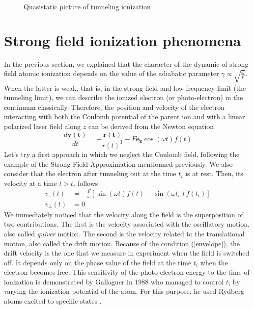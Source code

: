 \documentclass[a4paper]{article}
\begin{document}
\begin{figure}[h] 
\centering
 
 \caption{Quasistatic picture of tunneling ionization}
 \label{tunneling_ionization} 
\end{figure}

\section{Strong field ionization phenomena}

In the previous section, we explained that the character of the dynamic of strong field atomic ionization depends on the value of the adiabatic parameter $\gamma \propto \sqrt{\frac{\omega}{F}}$. When the latter is weak, that is, in the strong field and low-frequency limit (the tunneling limit), we can describe the ionized electron (or photo-electron) in the continuum classically. Therefore, the position and velocity of the electron interacting with both the Coulomb potential of the parent ion and with a linear polarized laser field along $z$ can be derived from the Newton equation
\begin{equation}
\frac{d \mathbf{v(t)}}{dt}=-\frac{\mathbf{r(t)}}{r(t)^{3}}-F\mathbf{e_{z}}\cos(\omega t) f(t) 
\end{equation}
Let's try a first approach in which we neglect the Coulomb field, following the example of the Strong Field Approximation mentionned previously. We also consider that the electron after tunneling out at the time $t_{i}$ is at rest. Then, its velocity at a time $t>t_{i}$ follows
\begin{align}
\label{velocity_free_motion}
v_{z}(t)&=-\frac{F}{\omega}\left[\sin(\omega t) f(t)-\sin(\omega t_{i}) f(t_{i})\right] \\
v_{\perp}(t)&=0
\end{align}
We immediately noticed that the velocity along the field is the superposition of two contributions. The first is the velocity associated with the oscillatory motion, also called \textit{quiver} motion. The second is the velocity related to the translational motion, also called the drift motion. Because of the condition (\ref{envelope}), the drift velocity is the one that we measure in experiment when the field is switched off. It depends only on the phase value of the field at the time $t_{i}$ when the electron becomes free. This sensitivity of the photo-electron energy to the time of ionization is demonstrated by Gallaguer in 1988 who managed to control $t_{i}$ by varying the ionization potential of the atom. For this purpose, he used Rydberg atoms excited to specific states \cite{Gallagher_1988}.
\end{document}
